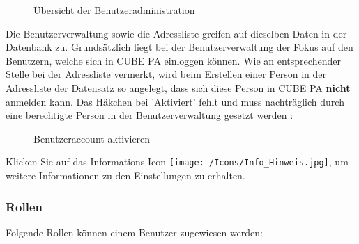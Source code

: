 \begin{figure}[H]
\caption{Übersicht der Benutzeradministration}
\end{figure}

Die Benutzerverwaltung sowie die Adressliste greifen auf dieselben Daten in der Datenbank zu. Grundsätzlich liegt bei der Benutzerverwaltung der Fokus auf den Benutzern, welche sich in CUBE PA einloggen können. Wie an entsprechender Stelle bei der Adressliste vermerkt, wird beim Erstellen einer Person in der Adressliste der Datensatz so angelegt, dass sich diese Person in CUBE PA \textbf{nicht} anmelden kann. Das Häkchen bei 'Aktiviert' fehlt und muss nachträglich durch eine berechtigte Person in der Benutzerverwaltung gesetzt werden :

\begin{figure}[H]
\caption{Benutzeraccount aktivieren}
\end{figure}

Klicken Sie auf das Informations-Icon \texttt{[image: /Icons/Info\_Hinweis.jpg]}, um weitere Informationen zu den Einstellungen zu erhalten.

\vspace{-10pt}

\subsubsection{Rollen}
\label{bkm:Ref445361985}

Folgende Rollen können einem Benutzer zugewiesen werden:

